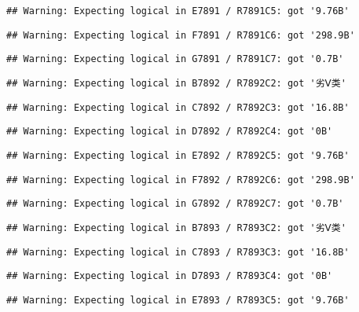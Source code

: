 \documentclass[
]{article}
\begin{document}
\begin{verbatim}
## Warning: Expecting logical in E7891 / R7891C5: got '9.76B'
\end{verbatim}

\begin{verbatim}
## Warning: Expecting logical in F7891 / R7891C6: got '298.9B'
\end{verbatim}

\begin{verbatim}
## Warning: Expecting logical in G7891 / R7891C7: got '0.7B'
\end{verbatim}

\begin{verbatim}
## Warning: Expecting logical in B7892 / R7892C2: got '劣Ⅴ类'
\end{verbatim}

\begin{verbatim}
## Warning: Expecting logical in C7892 / R7892C3: got '16.8B'
\end{verbatim}

\begin{verbatim}
## Warning: Expecting logical in D7892 / R7892C4: got '0B'
\end{verbatim}

\begin{verbatim}
## Warning: Expecting logical in E7892 / R7892C5: got '9.76B'
\end{verbatim}

\begin{verbatim}
## Warning: Expecting logical in F7892 / R7892C6: got '298.9B'
\end{verbatim}

\begin{verbatim}
## Warning: Expecting logical in G7892 / R7892C7: got '0.7B'
\end{verbatim}

\begin{verbatim}
## Warning: Expecting logical in B7893 / R7893C2: got '劣Ⅴ类'
\end{verbatim}

\begin{verbatim}
## Warning: Expecting logical in C7893 / R7893C3: got '16.8B'
\end{verbatim}

\begin{verbatim}
## Warning: Expecting logical in D7893 / R7893C4: got '0B'
\end{verbatim}

\begin{verbatim}
## Warning: Expecting logical in E7893 / R7893C5: got '9.76B'
\end{verbatim}
\end{document}
